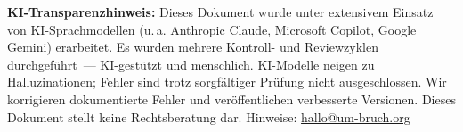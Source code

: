 \documentclass{umbruch-position}
\begin{document}
\vspace{2mm}
\noindent\textbf{KI-Transparenzhinweis:} Dieses Dokument wurde unter extensivem Einsatz von KI-Sprachmodellen (u.\,a. Anthropic Claude, Microsoft Copilot, Google Gemini) erarbeitet. Es wurden mehrere Kontroll- und Reviewzyklen durchgef\"uhrt~--- KI-gest\"utzt und menschlich. KI-Modelle neigen zu Halluzinationen; Fehler sind trotz sorgf\"altiger Pr\"ufung nicht ausgeschlossen. Wir korrigieren dokumentierte Fehler und ver\"offentlichen verbesserte Versionen. Dieses Dokument stellt keine Rechtsberatung dar. Hinweise: \href{mailto:hallo@um-bruch.org}{hallo@um-bruch.org}
\end{document}
